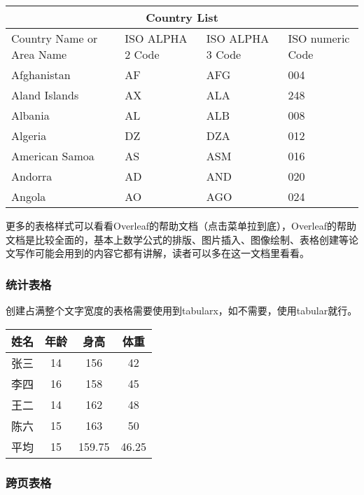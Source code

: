 \begin{table}[!htbp]
\centering
{}
\label{tab:5}
\begin{tabular}{ |p{3cm}||p{3cm}|p{3cm}|p{3cm}| }
 \hline
 \multicolumn{4}{|c|}{Country List} \\
 \hline
Country Name or Area Name& ISO ALPHA 2 Code & ISO ALPHA 3 Code & ISO numeric Code \\
 \hline
 Afghanistan   & AF    &AFG&   004\\
 Aland Islands&   AX  & ALA   &248\\
 Albania &AL & ALB&  008\\
 Algeria    &DZ & DZA&  012\\
 American Samoa&   AS  & ASM&016\\
 Andorra& AD  & AND   &020\\
 Angola& AO  & AGO&024\\
 \hline
\end{tabular}
\end{table}

更多的表格样式可以看看Overleaf的帮助文档（点击菜单拉到底），Overleaf的帮助文档是比较全面的，基本上数学公式的排版、图片插入、图像绘制、表格创建等论文写作可能会用到的内容它都有讲解，读者可以多在这一文档里看看。

\subsubsection{统计表格}

创建占满整个文字宽度的表格需要使用到tabularx，如不需要，使用tabular就行。

\begin{table}[!htb]
  \centering
  \label{tab:6}
  \begin{tabularx}{\textwidth}{CCCC}
    \toprule
    姓名&年龄&身高&体重\\
    \midrule
    张三&14&156&42\\
    李四&16&158&45\\
    王二&14&162&48\\
    陈六&15&163&50\\
    平均&15&159.75&46.25\\
    \bottomrule
  \end{tabularx}
\end{table}

\subsubsection{跨页表格}

